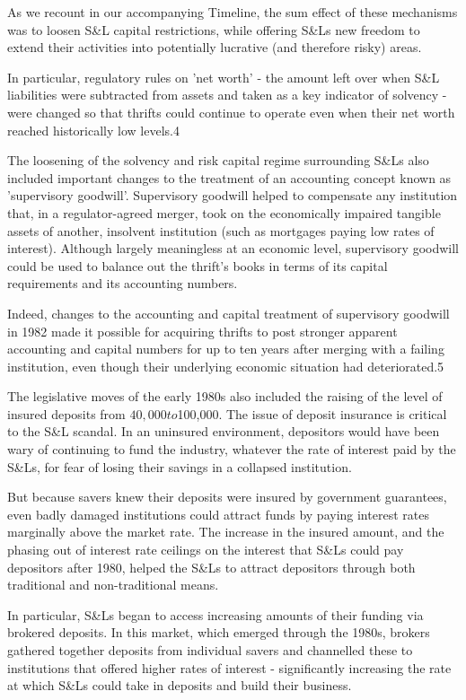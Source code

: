 As we recount in our accompanying Timeline, the sum effect of these mechanisms was to loosen S&L capital restrictions, while offering S&Ls new freedom to extend their activities into potentially lucrative (and therefore risky) areas.

In particular, regulatory rules on 'net worth' - the amount left over when S&L liabilities were subtracted from assets and taken as a key indicator of solvency - were changed so that thrifts could continue to operate even when their net worth reached historically low levels.4

The loosening of the solvency and risk capital regime surrounding S&Ls also included important changes to the treatment of an accounting concept known as 'supervisory goodwill'. Supervisory goodwill helped to compensate any institution that, in a regulator-agreed merger, took on the economically impaired tangible assets of another, insolvent institution (such as mortgages paying low rates of interest). Although largely meaningless at an economic level, supervisory goodwill could be used to balance out the thrift's books in terms of its capital requirements and its accounting numbers.

Indeed, changes to the accounting and capital treatment of supervisory goodwill in 1982 made it possible for acquiring thrifts to post stronger apparent accounting and capital numbers for up to ten years after merging with a failing institution, even though their underlying economic situation had deteriorated.5

The legislative moves of the early 1980s also included the raising of the level of insured deposits from $40,000 to $100,000. The issue of deposit insurance is critical to the S&L scandal. In an uninsured environment, depositors would have been wary of continuing to fund the industry, whatever the rate of interest paid by the S&Ls, for fear of losing their savings in a collapsed institution.

But because savers knew their deposits were insured by government guarantees, even badly damaged institutions could attract funds by paying interest rates marginally above the market rate. The increase in the insured amount, and the phasing out of interest rate ceilings on the interest that S&Ls could pay depositors after 1980, helped the S&Ls to attract depositors through both traditional and non-traditional means.

In particular, S&Ls began to access increasing amounts of their funding via brokered deposits. In this market, which emerged through the 1980s, brokers gathered together deposits from individual savers and channelled these to institutions that offered higher rates of interest - significantly increasing the rate at which S&Ls could take in deposits and build their business.

